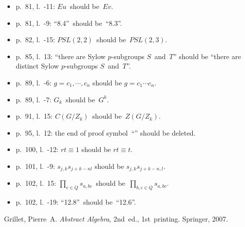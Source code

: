 \documentclass[letterpaper,12pt]{article}
\begin{document}
\begin{itemize}
\item p.~81, l.~-11: \(Eu\)~should be~\(Ev\).
\item p.~81, l.~-9: ``8.4''~should be~``8.3''.
\item p.~82, l.~-15: \(PSL(2,2)\)~should be~\(PSL(2,3)\).
\item p.~85, l.~13: ``there are Sylow \(p\)-subgroups \(S\)~and~\(T\)'' should be ``there are distinct Sylow \(p\)-subgroups \(S\)~and~\(T\)''.
\item p.~89, l.~-6: \(g=c_1,\cdots,c_n\) should be \(g=c_1\cdots c_n\).
\item p.~89, l.~-7: \(G_k\)~should be~\(G^k\).
\item p.~91, l.~15: \(C(G/Z_k)\)~should be~\(Z(G/Z_k)\).
\item p.~95, l.~12: the end of proof symbol~``\qedsymbol'' should be deleted.
\item p.~100, l.~-12: \(rt\equiv 1\) should be \(rt\equiv t\).
\item p.~101, l.~-9: \(s_{j,k}s_{j+k-nl}\) should be \(s_{j,k}s_{j+k-n,l}\).
\item p.~102, l.~15: \(\prod_{c\in Q}s_{a,bc}\)~should be~\(\prod_{b,c\in Q}s_{a,bc}\).
\item p.~102, l.~-19: ``12.8''~should be~``12.6''.
\end{itemize}

\begin{thebibliography}{0}
 Grillet, Pierre~A. \textit{Abstract Algebra}, 2nd~ed., 1st~printing. Springer, 2007.
\end{thebibliography}
\end{document}
